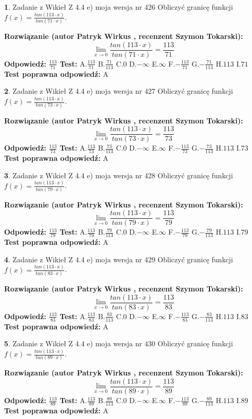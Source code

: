 \documentclass[12pt, a4paper]{article}
\theoremstyle{definition} %
\newtheorem{zad}{}
\newcommand{\zadStart}[1]{\begin{zad}#1\newline}
\newcommand{\zadStop}{\end{zad}}
\newcommand{\rozwStart}[2]{\noindent \textbf{Rozwiązanie (autor #1 , recenzent #2): }\newline}
\newcommand{\rozwStop}{\newline}
\newcommand{\odpStart}{\noindent \textbf{Odpowiedź:}\newline}
\newcommand{\odpStop}{\newline}
\newcommand{\testStart}{\noindent \textbf{Test:}\newline}
\newcommand{\testStop}{\newline}
\newcommand{\kluczStart}{\noindent \textbf{Test poprawna odpowiedź:}\newline}
\newcommand{\kluczStop}{\newline}
\begin{document}
\zadStart{Zadanie z Wikieł Z 4.4 e) moja wersja nr 426}
Obliczyć granicę funkcji $f(x)=\frac{tan(113\cdot x)}{tan(71\cdot x)}$.
\zadStop
\rozwStart{Patryk Wirkus}{Szymon Tokarski}
$$\lim\limits_{x\to 0}\frac{tan(113\cdot x)}{tan(71\cdot x)}=
\frac{113}{71}$$
\rozwStop
\odpStart
$\frac{113}{71}$
\odpStop
\testStart
A.$\frac{113}{71}$
B.$\frac{71}{113}$
C.$0$
D.$-\infty$
E.$\infty$
F.$-\frac{113}{71}$
G.$-\frac{71}{113}$
H.$113$
I.$71$
\testStop
\kluczStart
A
\kluczStop



\zadStart{Zadanie z Wikieł Z 4.4 e) moja wersja nr 427}
Obliczyć granicę funkcji $f(x)=\frac{tan(113\cdot x)}{tan(73\cdot x)}$.
\zadStop
\rozwStart{Patryk Wirkus}{Szymon Tokarski}
$$\lim\limits_{x\to 0}\frac{tan(113\cdot x)}{tan(73\cdot x)}=
\frac{113}{73}$$
\rozwStop
\odpStart
$\frac{113}{73}$
\odpStop
\testStart
A.$\frac{113}{73}$
B.$\frac{73}{113}$
C.$0$
D.$-\infty$
E.$\infty$
F.$-\frac{113}{73}$
G.$-\frac{73}{113}$
H.$113$
I.$73$
\testStop
\kluczStart
A
\kluczStop



\zadStart{Zadanie z Wikieł Z 4.4 e) moja wersja nr 428}
Obliczyć granicę funkcji $f(x)=\frac{tan(113\cdot x)}{tan(79\cdot x)}$.
\zadStop
\rozwStart{Patryk Wirkus}{Szymon Tokarski}
$$\lim\limits_{x\to 0}\frac{tan(113\cdot x)}{tan(79\cdot x)}=
\frac{113}{79}$$
\rozwStop
\odpStart
$\frac{113}{79}$
\odpStop
\testStart
A.$\frac{113}{79}$
B.$\frac{79}{113}$
C.$0$
D.$-\infty$
E.$\infty$
F.$-\frac{113}{79}$
G.$-\frac{79}{113}$
H.$113$
I.$79$
\testStop
\kluczStart
A
\kluczStop



\zadStart{Zadanie z Wikieł Z 4.4 e) moja wersja nr 429}
Obliczyć granicę funkcji $f(x)=\frac{tan(113\cdot x)}{tan(83\cdot x)}$.
\zadStop
\rozwStart{Patryk Wirkus}{Szymon Tokarski}
$$\lim\limits_{x\to 0}\frac{tan(113\cdot x)}{tan(83\cdot x)}=
\frac{113}{83}$$
\rozwStop
\odpStart
$\frac{113}{83}$
\odpStop
\testStart
A.$\frac{113}{83}$
B.$\frac{83}{113}$
C.$0$
D.$-\infty$
E.$\infty$
F.$-\frac{113}{83}$
G.$-\frac{83}{113}$
H.$113$
I.$83$
\testStop
\kluczStart
A
\kluczStop



\zadStart{Zadanie z Wikieł Z 4.4 e) moja wersja nr 430}
Obliczyć granicę funkcji $f(x)=\frac{tan(113\cdot x)}{tan(89\cdot x)}$.
\zadStop
\rozwStart{Patryk Wirkus}{Szymon Tokarski}
$$\lim\limits_{x\to 0}\frac{tan(113\cdot x)}{tan(89\cdot x)}=
\frac{113}{89}$$
\rozwStop
\odpStart
$\frac{113}{89}$
\odpStop
\testStart
A.$\frac{113}{89}$
B.$\frac{89}{113}$
C.$0$
D.$-\infty$
E.$\infty$
F.$-\frac{113}{89}$
G.$-\frac{89}{113}$
H.$113$
I.$89$
\testStop
\kluczStart
A
\kluczStop
\end{document}

